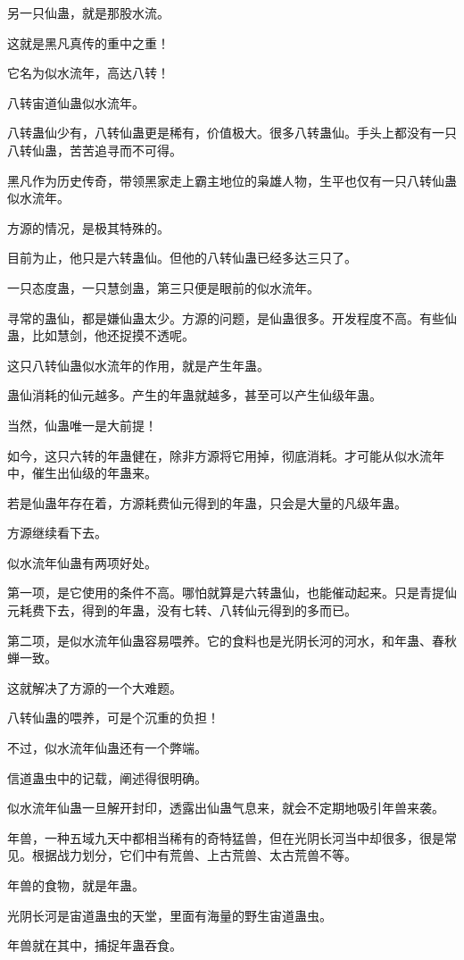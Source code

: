\begin{this_body}
另一只仙蛊，就是那股水流。

这就是黑凡真传的重中之重！

它名为似水流年，高达八转！

八转宙道仙蛊似水流年。

八转蛊仙少有，八转仙蛊更是稀有，价值极大。很多八转蛊仙。手头上都没有一只八转仙蛊，苦苦追寻而不可得。

黑凡作为历史传奇，带领黑家走上霸主地位的枭雄人物，生平也仅有一只八转仙蛊似水流年。

方源的情况，是极其特殊的。

目前为止，他只是六转蛊仙。但他的八转仙蛊已经多达三只了。

一只态度蛊，一只慧剑蛊，第三只便是眼前的似水流年。

寻常的蛊仙，都是嫌仙蛊太少。方源的问题，是仙蛊很多。开发程度不高。有些仙蛊，比如慧剑，他还捉摸不透呢。

这只八转仙蛊似水流年的作用，就是产生年蛊。

蛊仙消耗的仙元越多。产生的年蛊就越多，甚至可以产生仙级年蛊。

当然，仙蛊唯一是大前提！

如今，这只六转的年蛊健在，除非方源将它用掉，彻底消耗。才可能从似水流年中，催生出仙级的年蛊来。

若是仙蛊年存在着，方源耗费仙元得到的年蛊，只会是大量的凡级年蛊。

方源继续看下去。

似水流年仙蛊有两项好处。

第一项，是它使用的条件不高。哪怕就算是六转蛊仙，也能催动起来。只是青提仙元耗费下去，得到的年蛊，没有七转、八转仙元得到的多而已。

第二项，是似水流年仙蛊容易喂养。它的食料也是光阴长河的河水，和年蛊、春秋蝉一致。

这就解决了方源的一个大难题。

八转仙蛊的喂养，可是个沉重的负担！

不过，似水流年仙蛊还有一个弊端。

信道蛊虫中的记载，阐述得很明确。

似水流年仙蛊一旦解开封印，透露出仙蛊气息来，就会不定期地吸引年兽来袭。

年兽，一种五域九天中都相当稀有的奇特猛兽，但在光阴长河当中却很多，很是常见。根据战力划分，它们中有荒兽、上古荒兽、太古荒兽不等。

年兽的食物，就是年蛊。

光阴长河是宙道蛊虫的天堂，里面有海量的野生宙道蛊虫。

年兽就在其中，捕捉年蛊吞食。


\end{this_body}
